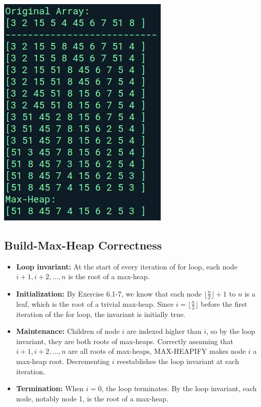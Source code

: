 \documentclass[12pt,openany]{book}
\theoremstyle{definition}
\begin{document}
\begin{center}
\begin{minipage}{.325\textwidth}
			\includegraphics[width=\textwidth]{BuildMaxHeap_print.png}
		\end{minipage}
	\end{center}

	\newpage
	\subsection{Build-Max-Heap Correctness}
	\begin{itemize}
		\item \textbf{Loop invariant:} At the start of every iteration of for loop, each node \( i + 1, i + 2, \ldots, n \) is the root of a max-heap.
		\item 
		\textbf{Initialization:} By Exercise 6.1-7, we know that each node \( \lfloor \frac{n}{2} \rfloor + 1 \) to \( n \) is a leaf, which is the root of a trivial max-heap. Since \( i = \lfloor \frac{n}{2} \rfloor \) before the first iteration of the for loop, the invariant is initially true.
		\item 
		\textbf{Maintenance:} Children of node \( i \) are indexed higher than \( i \), so by the loop invariant, they are both roots of max-heaps. Correctly assuming that \( i + 1, i + 2, \ldots, n \) are all roots of max-heaps, MAX-HEAPIFY makes node \( i \) a max-heap root. Decrementing \( i \) reestablishes the loop invariant at each iteration.
		\item 
		\textbf{Termination:} When \( i = 0 \), the loop terminates. By the loop invariant, each node, notably node 1, is the root of a max-heap.
	\end{itemize}
	
\end{document}
